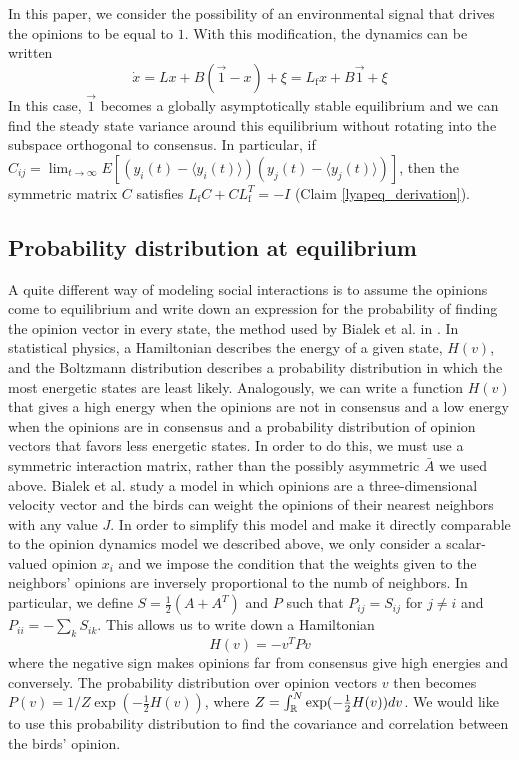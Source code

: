 \documentclass{article}
\begin{document}
In this paper, we consider the possibility of an environmental signal that drives the opinions to be equal to $1$. With this modification, the dynamics can be written
\begin{equation}
\dot{x}=Lx+B(\vec{1}-x)+\xi=L_\text{f}x+B\vec{1}+\xi
\end{equation}
In this case, $\vec{1}$ becomes a globally asymptotically stable equilibrium and we can find the steady state variance around this equilibrium without rotating into the subspace orthogonal to consensus. In particular, if $C_{ij}=\lim_{t\to\infty}E[(y_i(t)-\langle y_i(t)\rangle)(y_j(t)-\langle y_j(t)\rangle)]$, then the symmetric matrix $C$ satisfies $L_\text{f}C+CL_\text{f}^T=-I$ (Claim \ref{lyapeq_derivation}).

\subsection{Probability distribution at equilibrium }
A quite different way of modeling social interactions is to assume the opinions come to equilibrium and write down an expression for the probability of finding the opinion vector in every state, the method used by Bialek et al. in \cite{Bialek:2012fk}. In statistical physics, a Hamiltonian describes the energy of a given state, $H(v)$, and the Boltzmann distribution describes a probability distribution in which the most energetic states are least likely. Analogously, we can write a function $H(v)$ that gives a high energy when the opinions are not in consensus and a low energy when the opinions are in consensus and a probability distribution of opinion vectors that favors less energetic states. In order to do this, we must use a symmetric interaction matrix, rather than the possibly asymmetric $\bar{A}$ we used above. Bialek et al. study a model in which opinions are a three-dimensional velocity vector and the birds can weight the opinions of their nearest neighbors with any value $J$. In order to simplify this model and make it directly comparable to the opinion dynamics model we described above, we only consider a scalar-valued opinion $x_i$ and we impose the condition that the weights given to the neighbors' opinions are inversely proportional to the numb of neighbors. In particular, we define $S=\frac{1}{2}(A+A^T)$ and $P$ such that $P_{ij}=S_{ij}$ for $j\neq i$ and $P_{ii}=-\sum_kS_{ik}$. This allows us to write down a Hamiltonian
\begin{equation}
H(v)=-v^TPv
\end{equation}
where the negative sign makes opinions far from consensus give high energies and conversely. The probability distribution over opinion vectors $v$ then becomes $P(v)=1/Z\exp(-\frac{1}{2}H(v))$, where $Z=\int_{\mathbb{R}}^N\exp(-\frac{1}{2}H(v))dv$. We would like to use this probability distribution to find the covariance and correlation between the birds' opinion. 
\end{document}
